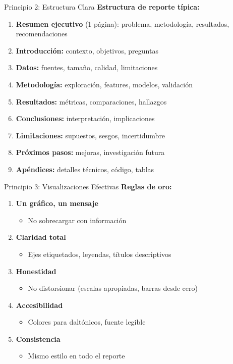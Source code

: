 \documentclass[aspectratio=169]{beamer}
\begin{document}
\begin{frame}{Principio 2: Estructura Clara}
\textbf{Estructura de reporte típica:}

\begin{enumerate}
\item \textbf{Resumen ejecutivo} (1 página): problema, metodología, resultados, recomendaciones
\item \textbf{Introducción:} contexto, objetivos, preguntas
\item \textbf{Datos:} fuentes, tamaño, calidad, limitaciones
\item \textbf{Metodología:} exploración, features, modelos, validación
\item \textbf{Resultados:} métricas, comparaciones, hallazgos
\item \textbf{Conclusiones:} interpretación, implicaciones
\item \textbf{Limitaciones:} supuestos, sesgos, incertidumbre
\item \textbf{Próximos pasos:} mejoras, investigación futura
\item \textbf{Apéndices:} detalles técnicos, código, tablas
\end{enumerate}
\end{frame}

\begin{frame}{Principio 3: Visualizaciones Efectivas}
\textbf{Reglas de oro:}

\begin{enumerate}
\item \textbf{Un gráfico, un mensaje}
\begin{itemize}
\item No sobrecargar con información
\end{itemize}

\item \textbf{Claridad total}
\begin{itemize}
\item Ejes etiquetados, leyendas, títulos descriptivos
\end{itemize}

\item \textbf{Honestidad}
\begin{itemize}
\item No distorsionar (escalas apropiadas, barras desde cero)
\end{itemize}

\item \textbf{Accesibilidad}
\begin{itemize}
\item Colores para daltónicos, fuente legible
\end{itemize}

\item \textbf{Consistencia}
\begin{itemize}
\item Mismo estilo en todo el reporte
\end{itemize}
\end{enumerate}
\end{frame}
\end{document}
